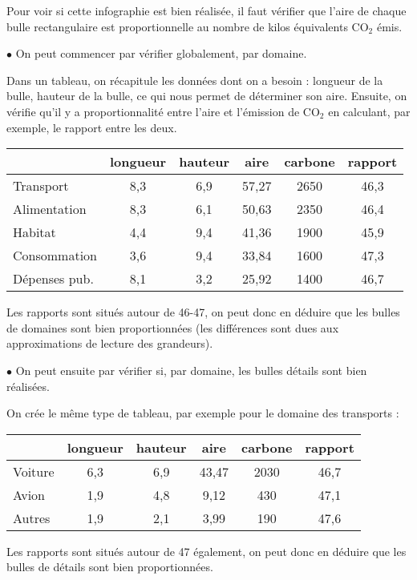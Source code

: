    Pour voir si cette infographie est bien réalisée, il faut vérifier que l'aire de chaque \og bulle \fg{} rectangulaire est proportionnelle au nombre de kilos équivalents CO$_{2}$ émis. \par
   $\bullet$ On peut commencer par vérifier globalement, par domaine. \par
      Dans un tableau, on récapitule les données dont on a besoin : longueur de la bulle, hauteur de la bulle, ce qui nous permet de déterminer son aire. Ensuite, on vérifie qu'il y a proportionnalité entre l'aire et l'émission de CO$_{2}$ en calculant, par exemple, le rapport entre les deux. \par
      \begin{center}
         { \small
         \begin{tabular}{|p{3cm}|*5{C{1.5}|}}
            \hline
            & longueur & hauteur & aire & carbone & rapport \\
            \hline
            Transport & 8,3 & 6,9 & 57,27 & 2650 & 46,3 \\
            \hline
            Alimentation & 8,3 & 6,1 & 50,63 & 2350 & 46,4 \\
            \hline
            Habitat & 4,4 & 9,4 & 41,36 & 1900 & 45,9 \\
            \hline
            Consommation & 3,6 & 9,4 & 33,84 & 1600 & 47,3 \\
            \hline
            Dépenses pub. & 8,1 & 3,2 & 25,92 & 1400 & 46,7 \\
            \hline
         \end{tabular}}
      \end{center}
      Les rapports sont situés autour de 46-47, on peut donc en déduire que les bulles de domaines sont bien proportionnées (les différences sont dues aux approximations de lecture des grandeurs). \medskip
   
   $\bullet$ On peut ensuite par vérifier si, par domaine, les bulles détails sont bien réalisées. \par
      On crée le même type de tableau, par exemple pour le domaine des transports :
      \begin{center}
         { \small
         \begin{tabular}{|p{3cm}|*5{C{1.5}|}}
            \hline
            & longueur & hauteur & aire & carbone & rapport \\
            \hline
            Voiture & 6,3 & 6,9 & 43,47 & 2030 & 46,7 \\
            \hline
            Avion & 1,9 & 4,8 & 9,12 & 430 & 47,1 \\
            \hline
            Autres & 1,9 & 2,1 & 3,99 & 190 & 47,6 \\
            \hline
         \end{tabular}}
      \end{center}  
   Les rapports sont situés autour de 47 également, on peut donc en déduire que les bulles de détails sont bien proportionnées. \medskip
   
